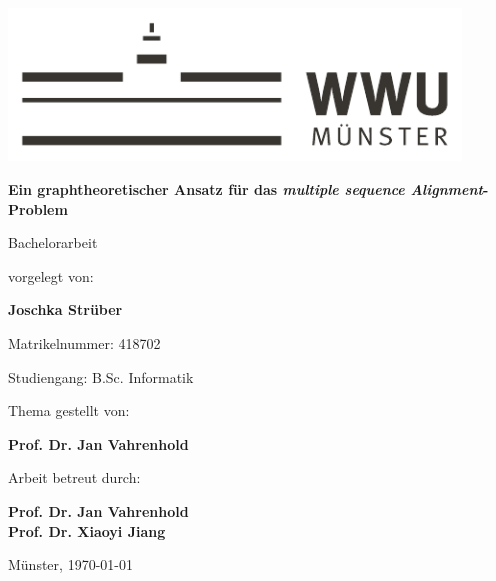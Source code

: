 \begin{centering}
\includegraphics[width=12cm]{./img/wwu-logo-neu.pdf}

\vspace{2cm} 

{\LARGE
	\textbf{Ein graphtheoretischer Ansatz für das \emph{multiple sequence Alignment}-Problem}\\[1.2cm]
}

{\large
	Bachelorarbeit\\[2cm]
}

{\large
	vorgelegt von:
}

{ \Large
	\textbf{Joschka Strüber}\\[1cm]
}

{\large
	Matrikelnummer: 418702\\[2mm]
}

{\large
	Studiengang: B.Sc. Informatik\\[1cm]
}
    
{\large
	Thema gestellt von:
}

{\Large
	\textbf{Prof. Dr. Jan Vahrenhold}\\[1cm]
}
                               
{\large
	Arbeit betreut durch:
}

{\Large
	\textbf{Prof. Dr. Jan Vahrenhold \\ Prof. Dr. Xiaoyi Jiang}\\[1cm]
}

{\large
Münster, \today
}
\vfill
\end{centering}